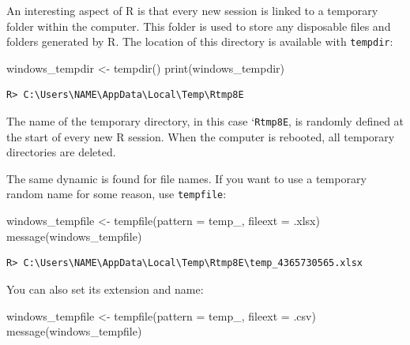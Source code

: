 \documentclass[
  12pt,
]{book}
\newenvironment{Shaded}{\begin{snugshade}}{\end{snugshade}}
\newcommand{\AttributeTok}[1]{\textcolor[rgb]{0.61,0.61,0.61}{#1}}
\newcommand{\FunctionTok}[1]{\textcolor[rgb]{0,0,0}{#1}}
\newcommand{\NormalTok}[1]{#1}
\newcommand{\OtherTok}[1]{\textcolor[rgb]{0.37,0.37,0.37}{#1}}
\newcommand{\StringTok}[1]{\textcolor[rgb]{0.5,0.5,0.5}{#1}}
\begin{document}
An interesting aspect of R is that every new session is linked to a temporary folder within the computer. This folder is used to store any disposable files and folders generated by R. The location of this directory is available with \texttt{tempdir}:

\begin{Shaded}
\begin{Highlighting}[]
\NormalTok{windows\_tempdir }\OtherTok{\textless{}{-}} \FunctionTok{tempdir}\NormalTok{()}
\FunctionTok{print}\NormalTok{(windows\_tempdir)}
\end{Highlighting}
\end{Shaded}

\begin{verbatim}
R> C:\Users\NAME\AppData\Local\Temp\Rtmp8E
\end{verbatim}

The name of the temporary directory, in this case `\texttt{Rtmp8E\textquotesingle{}}, is randomly defined at the start of every new R session. When the computer is rebooted, all temporary directories are deleted.

The same dynamic is found for file names. If you want to use a temporary random name for some reason, use \texttt{tempfile}:

\begin{Shaded}
\begin{Highlighting}[]
\NormalTok{windows\_tempfile }\OtherTok{\textless{}{-}} \FunctionTok{tempfile}\NormalTok{(}\AttributeTok{pattern =} \StringTok{\textquotesingle{}temp\_\textquotesingle{}}\NormalTok{,}
                             \AttributeTok{fileext =} \StringTok{\textquotesingle{}.xlsx\textquotesingle{}}\NormalTok{)}
\FunctionTok{message}\NormalTok{(windows\_tempfile)}
\end{Highlighting}
\end{Shaded}

\begin{verbatim}
R> C:\Users\NAME\AppData\Local\Temp\Rtmp8E\temp_4365730565.xlsx
\end{verbatim}

You can also set its extension and name:

\begin{Shaded}
\begin{Highlighting}[]
\NormalTok{windows\_tempfile }\OtherTok{\textless{}{-}} \FunctionTok{tempfile}\NormalTok{(}\AttributeTok{pattern =} \StringTok{\textquotesingle{}temp\_\textquotesingle{}}\NormalTok{, }
                             \AttributeTok{fileext =} \StringTok{\textquotesingle{}.csv\textquotesingle{}}\NormalTok{)}
\FunctionTok{message}\NormalTok{(windows\_tempfile)}
\end{Highlighting}
\end{Shaded}
\end{document}
